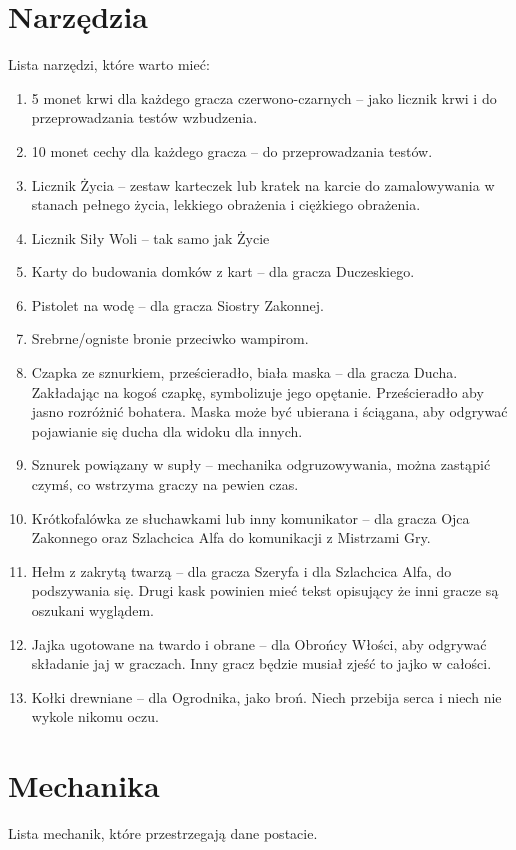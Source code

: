 \section{Narzędzia}
	Lista narzędzi, które warto mieć:
	\begin{enumerate}
		\item 5 monet krwi dla każdego gracza czerwono-czarnych -- jako licznik krwi i do przeprowadzania testów wzbudzenia.
		\item 10 monet cechy dla każdego gracza -- do przeprowadzania testów.
		\item Licznik Życia -- zestaw karteczek lub kratek na karcie do zamalowywania w stanach pełnego życia, lekkiego obrażenia i ciężkiego obrażenia.
		\item Licznik Siły Woli -- tak samo jak Życie
		\item Karty do budowania domków z kart -- dla gracza Duczeskiego.
		\item Pistolet na wodę -- dla gracza Siostry Zakonnej.
		\item Srebrne/ogniste bronie przeciwko wampirom.
		\item Czapka ze sznurkiem, prześcieradło, biała maska -- dla gracza Ducha. Zakładając na kogoś czapkę, symbolizuje jego opętanie.
			Prześcieradło aby jasno rozróżnić bohatera. Maska może być ubierana i ściągana, aby odgrywać pojawianie się ducha dla widoku dla innych.
		\item Sznurek powiązany w supły -- mechanika odgruzowywania, można zastąpić czymś, co wstrzyma graczy na pewien czas.
		\item Krótkofalówka ze słuchawkami lub inny komunikator -- dla gracza Ojca Zakonnego oraz Szlachcica Alfa do komunikacji z Mistrzami Gry.
		\item Hełm z zakrytą twarzą -- dla gracza Szeryfa i dla Szlachcica Alfa, do podszywania się.
			Drugi kask powinien mieć tekst opisujący że inni gracze są oszukani wyglądem.
		\item Jajka ugotowane na twardo i obrane -- dla Obrońcy Włości, aby odgrywać składanie jaj w graczach. Inny gracz będzie musiał zjeść to jajko w całości.
		\item Kołki drewniane -- dla Ogrodnika, jako broń. Niech przebija serca i niech nie wykole nikomu oczu.
	\end{enumerate}
	
	
\section{Mechanika}
	Lista mechanik, które przestrzegają dane postacie.
	
